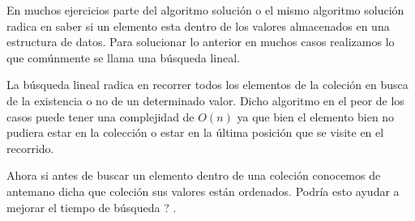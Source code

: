En muchos ejercicios parte del algoritmo solución o el mismo algoritmo solución radica en saber si un elemento esta dentro de los valores almacenados en una estructura de datos. Para solucionar lo anterior en muchos casos realizamos lo que comúnmente se llama una búsqueda lineal. 

La búsqueda lineal radica en recorrer todos los elementos de la coleción en busca de la existencia o no de un determinado valor. Dicho algoritmo en el peor de los casos puede tener una complejidad de $O(n)$ ya que bien el elemento bien no pudiera estar en la colección o estar en la última posición que se visite en el recorrido.

Ahora si antes de buscar un elemento dentro de una coleción conocemos de antemano dicha que coleción sus valores están ordenados. Podría esto ayudar a mejorar el tiempo de búsqueda ? .